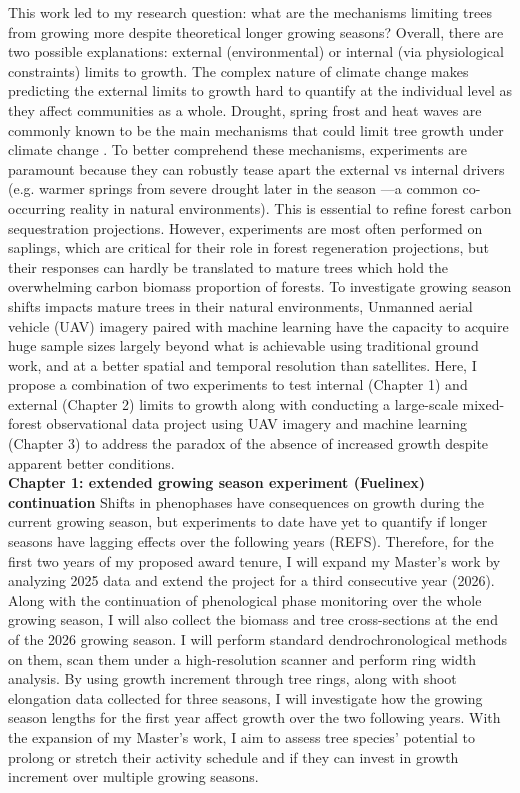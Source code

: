 \documentclass[12pt]{article}
\begin{document}
This work led to my research question: what are the mechanisms limiting trees from growing more despite theoretical longer growing seasons? Overall, there are two possible explanations: external (environmental) or internal (via physiological constraints)\citep{zohner_effect_2023} limits to growth. The complex nature of climate change makes predicting the external limits to growth hard to quantify at the individual level as they affect communities as a whole. Drought, spring frost and heat waves are commonly known to be the main mechanisms that could limit tree growth under climate change \citep{drobyshev_influence_2008}. To better comprehend these mechanisms, experiments are paramount because they can robustly tease apart the external vs internal drivers (e.g. warmer springs from severe drought later in the season ---a common co-occurring reality in natural environments). This is essential to refine forest carbon sequestration projections. However, experiments are most often performed on saplings, which are critical for their role in forest regeneration projections, but their responses can hardly be translated to mature trees which hold the overwhelming carbon biomass proportion of forests. To investigate growing season shifts impacts mature trees in their natural environments, Unmanned aerial vehicle (UAV) imagery paired with machine learning have the capacity to acquire huge sample sizes largely beyond what is achievable using traditional ground work, and at a better spatial and temporal resolution than satellites. Here, I propose a combination of two experiments to test internal (Chapter 1) and external (Chapter 2) limits to growth along with conducting a large-scale mixed-forest observational data project using UAV imagery and machine learning (Chapter 3) to address the paradox of the absence of increased growth despite apparent better conditions. \\


\textbf{Chapter 1: extended growing season experiment (Fuelinex) continuation}
Shifts in phenophases have consequences on growth during the current growing season, but experiments to date have yet to quantify if longer seasons have lagging effects over the following years (REFS). Therefore, for the first two years of my proposed award tenure, I will expand my Master's work by analyzing 2025 data and extend the project for a third consecutive year (2026). Along with the continuation of phenological phase monitoring over the whole growing season, I will also collect the biomass and tree cross-sections at the end of the 2026 growing season. I will perform standard dendrochronological methods on them, scan them under a high-resolution scanner and perform ring width analysis. By using growth increment through tree rings, along with shoot elongation data collected for three seasons, I will investigate how the growing season lengths for the first year affect growth over the two following years. With the expansion of my Master's work, I aim to assess tree species’ potential to prolong or stretch their activity schedule and if they can invest in growth increment over multiple growing seasons. \\
\end{document}
